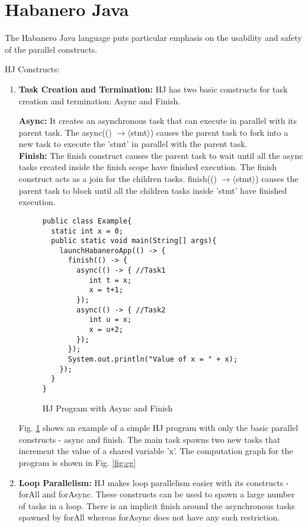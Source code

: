 \section{Habanero Java}

The Habanero Java language puts particular emphasis on the usability and safety of the parallel constructs. 

HJ Constructs:

\begin{enumerate}
\item \textbf{Task Creation and Termination:} HJ has two basic constructs for task creation and termination: Async and Finish. 

\textbf{Async:} It creates an asynchronous task that can execute in parallel with its parent task. The async(() $ \rightarrow \langle$stmt$\rangle$) causes the parent task to fork into a new task to execute the 'stmt' in parallel with the parent task. \\
\textbf{Finish:} The finish construct causes the parent task to wait until all the async tasks created inside the finish scope have finished execution. The finish construct acts as a join for the children tasks. finish(() $ \rightarrow \langle$stmt$\rangle$) causes the parent task to block until all the children tasks inside 'stmt' have finished execution.

\begin{figure}
  \begin{center}
    \begin{lstlisting}
public class Example{
  static int x = 0;
  public static void main(String[] args){
    launchHabaneroApp(() -> {
      finish(() -> {
        async(() -> { //Task1
           int t = x;
           x = t+1;
        });
        async(() -> { //Task2
           int u = x;
           x = u+2;		
        });
      });
      System.out.println("Value of x = " + x);	
    });
  }
}
\end{lstlisting}
  \end{center}
  \caption{HJ Program with Async and Finish}
  \label{fig:hj-async-finish}
\end{figure}

Fig. \ref{fig:hj-async-finish} shows an example of a simple HJ program with only the basic parallel constructs - async and finish. The main task spawns two new tasks that increment the value of a shared variable 'x'. The computation graph for the program is shown in Fig. \ref{fig:cg}

\item \textbf{Loop Parallelism:} HJ makes loop parallelism easier with its constructs - forAll and forAsync. These constructs can be used to spawn a large number of tasks in a loop. There is an implicit finish around the asynchronous tasks spawned by forAll whereas forAsync does not have any such restriction.


\end{enumerate}
